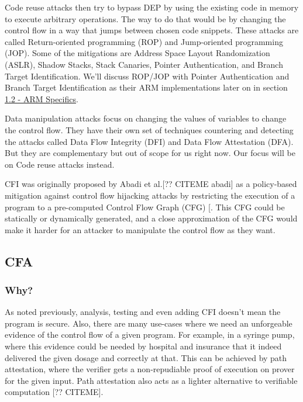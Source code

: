 \documentclass[a4paper, nobind]{templates/ociamthesis}
\begin{document}
Code reuse attacks then try to bypass DEP by using the existing code in memory to
execute arbitrary operations. The way to do that would be by changing the control
flow in a way that jumps between chosen code snippets. These attacks are called
Return-oriented programming (ROP) and Jump-oriented programming (JOP).
Some of the mitigations are Address Space Layout Randomization (ASLR),
Shadow Stacks, Stack Canaries, Pointer Authentication, and Branch Target Identification.
We'll discuss ROP/JOP with Pointer Authentication and Branch Target
Identification as their ARM implementations later on in section \hyperref[arm-specifics]{1.2 - ARM Specifics}.

Data manipulation attacks focus on changing the values of variables to change the control flow.
They have their own set of techniques countering and detecting the attacks called
Data Flow Integrity (DFI) and Data Flow Attestation (DFA). But they are complementary
but out of scope for us right now. Our focus will be on Code reuse attacks instead.

CFI was originally proposed by Abadi et al.{[}?? CITEME abadi{]} as a policy-based mitigation
against control flow hijacking attacks by restricting the execution of a program
to a pre-computed Control Flow Graph (CFG) {[}\citeproc{ref-sok}{2}{]}. This CFG could be statically or
dynamically generated, and a close approximation of the CFG would make it harder
for an attacker to manipulate the control flow as they want.

\subsection{CFA}\label{cfa}

\subsubsection{Why?}\label{why}

As noted previously, analysis, testing and even adding CFI doesn't mean the program is secure.
Also, there are many use-cases where we need an unforgeable evidence of the control flow
of a given program. For example, in a syringe pump, where this evidence could be
needed by hospital and insurance that it indeed delivered the given dosage and correctly at that.
This can be achieved by path attestation, where the verifier gets a non-repudiable
proof of execution on prover for the given input.
Path attestation also acts as a lighter alternative to verifiable computation {[}?? CITEME{]}.
\end{document}
